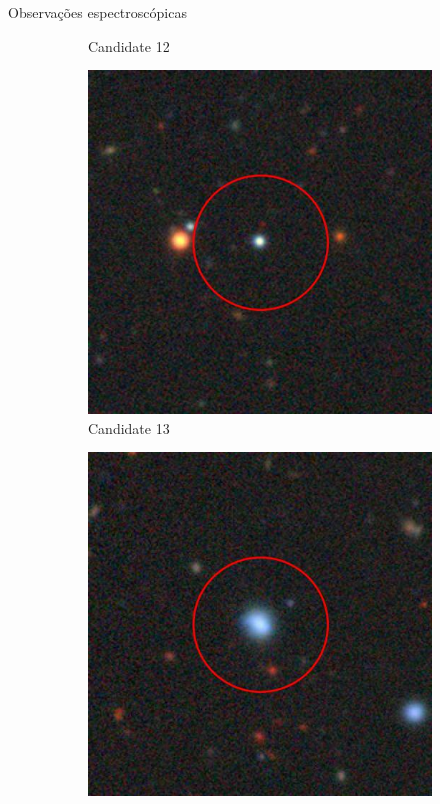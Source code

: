 \begin{frame}[c]{Observações espectroscópicas}
\begin{figure}
\begin{subfigure}[b]{0.11\textwidth}
        \caption{Candidate 12}
    \end{subfigure}
    \begin{subfigure}[b]{0.11\textwidth}
        \includegraphics[width=\textwidth]{images/proposatal_candidatas_1/UCG13.jpg}
        \caption{Candidate 13}
    \end{subfigure}
    \begin{subfigure}[b]{0.11\textwidth}
        \includegraphics[width=\textwidth]{images/proposatal_candidatas_1/UCG14.jpg}

\end{subfigure}
\end{figure}
\end{frame}
